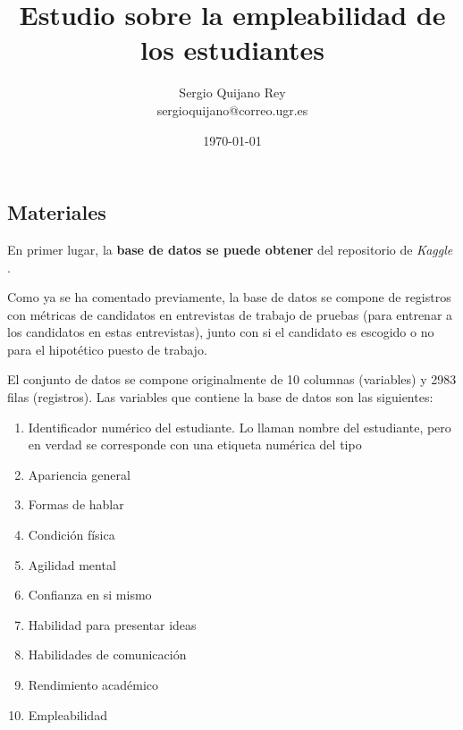 \documentclass[11pt]{article}
\title{
    Estudio sobre la empleabilidad de los estudiantes
}
\author{
    {Sergio Quijano Rey}\\
    {sergioquijano@correo.ugr.es}
}
\date{\today}
\begin{document}
\maketitle
\pagebreak

\tableofcontents


\listoffigures

\listoftables

{}

\pagebreak



\newpage


\newpage



\subsection{Materiales}

En primer lugar, la \textbf{base de datos se puede obtener} del repositorio de \textit{Kaggle} \cite{database:online}.

Como ya se ha comentado previamente, la base de datos se compone de registros con métricas de candidatos en entrevistas de trabajo de pruebas (para entrenar a los candidatos en estas entrevistas), junto con si el candidato es escogido o no para el hipotético puesto de trabajo.

El conjunto de datos se compone originalmente de 10 columnas (variables) y 2983 filas (registros). Las variables que contiene la base de datos son las siguientes:

\begin{enumerate}
    \item Identificador numérico del estudiante. Lo llaman nombre del estudiante, pero en verdad se corresponde con una etiqueta numérica del tipo 
    \item Apariencia general
    \item Formas de hablar
    \item Condición física
    \item Agilidad mental
    \item Confianza en si mismo
    \item Habilidad para presentar ideas
    \item Habilidades de comunicación
    \item Rendimiento académico
    \item Empleabilidad
\end{enumerate}
\end{document}
